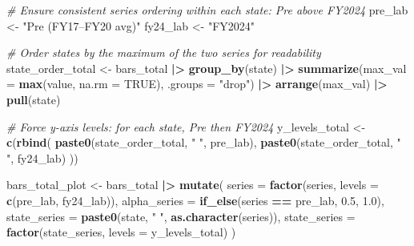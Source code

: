 \documentclass[
  11pt,
]{article}
\newenvironment{Shaded}{\begin{snugshade}}{\end{snugshade}}
\newcommand{\AttributeTok}[1]{\textcolor[rgb]{0.13,0.29,0.53}{#1}}
\newcommand{\CommentTok}[1]{\textcolor[rgb]{0.56,0.35,0.01}{\textit{#1}}}
\newcommand{\ConstantTok}[1]{\textcolor[rgb]{0.56,0.35,0.01}{#1}}
\newcommand{\FloatTok}[1]{\textcolor[rgb]{0.00,0.00,0.81}{#1}}
\newcommand{\FunctionTok}[1]{\textcolor[rgb]{0.13,0.29,0.53}{\textbf{#1}}}
\newcommand{\NormalTok}[1]{#1}
\newcommand{\OtherTok}[1]{\textcolor[rgb]{0.56,0.35,0.01}{#1}}
\newcommand{\SpecialCharTok}[1]{\textcolor[rgb]{0.81,0.36,0.00}{\textbf{#1}}}
\newcommand{\StringTok}[1]{\textcolor[rgb]{0.31,0.60,0.02}{#1}}
\begin{document}
\begin{Shaded}
\begin{Highlighting}[]
\CommentTok{\# Ensure consistent series ordering within each state: Pre above FY2024}
\NormalTok{pre\_lab }\OtherTok{\textless{}{-}} \StringTok{"Pre (FY17–FY20 avg)"}
\NormalTok{fy24\_lab }\OtherTok{\textless{}{-}} \StringTok{"FY2024"}

\CommentTok{\# Order states by the maximum of the two series for readability}
\NormalTok{state\_order\_total }\OtherTok{\textless{}{-}}\NormalTok{ bars\_total }\SpecialCharTok{|\textgreater{}}
  \FunctionTok{group\_by}\NormalTok{(state) }\SpecialCharTok{|\textgreater{}}
  \FunctionTok{summarize}\NormalTok{(}\AttributeTok{max\_val =} \FunctionTok{max}\NormalTok{(value, }\AttributeTok{na.rm =} \ConstantTok{TRUE}\NormalTok{), }\AttributeTok{.groups =} \StringTok{"drop"}\NormalTok{) }\SpecialCharTok{|\textgreater{}}
  \FunctionTok{arrange}\NormalTok{(max\_val) }\SpecialCharTok{|\textgreater{}}
  \FunctionTok{pull}\NormalTok{(state)}

\CommentTok{\# Force y{-}axis levels: for each state, Pre then FY2024}
\NormalTok{y\_levels\_total }\OtherTok{\textless{}{-}} \FunctionTok{c}\NormalTok{(}\FunctionTok{rbind}\NormalTok{(}
  \FunctionTok{paste0}\NormalTok{(state\_order\_total, }\StringTok{"  "}\NormalTok{, pre\_lab),}
  \FunctionTok{paste0}\NormalTok{(state\_order\_total, }\StringTok{"  "}\NormalTok{, fy24\_lab)}
\NormalTok{))}

\NormalTok{bars\_total\_plot }\OtherTok{\textless{}{-}}\NormalTok{ bars\_total }\SpecialCharTok{|\textgreater{}}
  \FunctionTok{mutate}\NormalTok{(}
    \AttributeTok{series =} \FunctionTok{factor}\NormalTok{(series, }\AttributeTok{levels =} \FunctionTok{c}\NormalTok{(pre\_lab, fy24\_lab)),}
    \AttributeTok{alpha\_series =} \FunctionTok{if\_else}\NormalTok{(series }\SpecialCharTok{==}\NormalTok{ pre\_lab, }\FloatTok{0.5}\NormalTok{, }\FloatTok{1.0}\NormalTok{),}
    \AttributeTok{state\_series =} \FunctionTok{paste0}\NormalTok{(state, }\StringTok{"  "}\NormalTok{, }\FunctionTok{as.character}\NormalTok{(series)),}
    \AttributeTok{state\_series =} \FunctionTok{factor}\NormalTok{(state\_series, }\AttributeTok{levels =}\NormalTok{ y\_levels\_total)}
\NormalTok{  )}


\end{Highlighting}
\end{Shaded}
\end{document}

